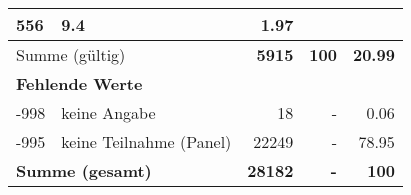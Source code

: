 \begin{longtable}{lXrrr}
       \num{556} &
       \num[round-mode=places,round-precision=2]{9.4} &
         \num[round-mode=places,round-precision=2]{1.97} \\
     \midrule
     \multicolumn{2}{l}{Summe (gültig)} &
       \textbf{\num{5915}} &
     \textbf{100} &
       \textbf{\num[round-mode=places,round-precision=2]{20.99}} \\
     \multicolumn{5}{l}{\textbf{Fehlende Werte}}\\
       -998 &
       keine Angabe &
         \num{18} &
        - &
         \num[round-mode=places,round-precision=2]{0.06} \\
       -995 &
       keine Teilnahme (Panel) &
         \num{22249} &
        - &
         \num[round-mode=places,round-precision=2]{78.95} \\
     \midrule
     \multicolumn{2}{l}{\textbf{Summe (gesamt)}} &
          \textbf{\num{28182}} &
        \textbf{-} &
        \textbf{100} \\
     \bottomrule
     \end{longtable}
     
